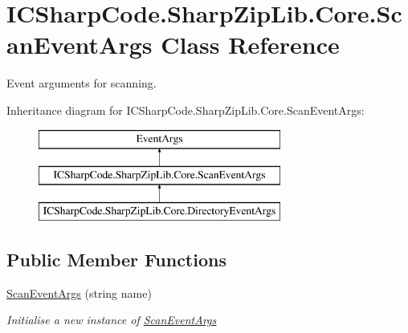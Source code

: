 \hypertarget{class_i_c_sharp_code_1_1_sharp_zip_lib_1_1_core_1_1_scan_event_args}{}\section{I\+C\+Sharp\+Code.\+Sharp\+Zip\+Lib.\+Core.\+Scan\+Event\+Args Class Reference}
\label{class_i_c_sharp_code_1_1_sharp_zip_lib_1_1_core_1_1_scan_event_args}


Event arguments for scanning.  


Inheritance diagram for I\+C\+Sharp\+Code.\+Sharp\+Zip\+Lib.\+Core.\+Scan\+Event\+Args\+:\begin{figure}[H]
\begin{center}
\leavevmode
\includegraphics[height=3.000000cm]{class_i_c_sharp_code_1_1_sharp_zip_lib_1_1_core_1_1_scan_event_args}
\end{center}
\end{figure}
\subsection*{Public Member Functions}
\begin{DoxyCompactItemize}
\item 
\hyperlink{class_i_c_sharp_code_1_1_sharp_zip_lib_1_1_core_1_1_scan_event_args_ae40108e29389873745c46f21b1f6187a}{Scan\+Event\+Args} (string name)
\begin{DoxyCompactList}\small\item\em Initialise a new instance of \hyperlink{class_i_c_sharp_code_1_1_sharp_zip_lib_1_1_core_1_1_scan_event_args}{Scan\+Event\+Args} \end{DoxyCompactList}\end{DoxyCompactItemize}
